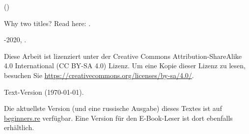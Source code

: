 \begin{titlepage}


\end{titlepage}

\newpage

\begin{center}
\vspace*{\fill}
{\LARGE \TitleMain}

\bigskip

{\large (\TitleAux)}

\bigskip
\bigskip
Why two titles? Read here: . %

\vspace*{\fill}

{\large \AUTHOR}

{\large \TT{<\EMAIL>}}
\vspace*{\fill}
\vfill

\ccbysa

-2020, \AUTHOR. 

Diese Arbeit ist lizenziert unter der Creative Commons Attribution-ShareAlike 4.0 International (CC BY-SA 4.0) Lizenz.
Um eine Kopie dieser Lizenz zu lesen, besuchen Sie \url{https://creativecommons.org/licenses/by-sa/4.0/}.

Text-Version ({\large \today}).

Die aktuellste Version (und eine russische Ausgabe) dieses Textes ist auf \href{http://go.yurichev.com/17009}{beginners.re} verfügbar.
Eine Version für den E-Book-Leser ist dort ebenfalls erhältlich.

\end{center}
